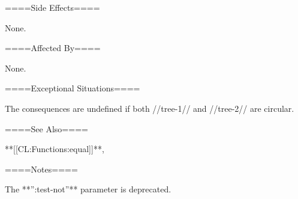 ====Side Effects====

None.

====Affected By====

None.

====Exceptional Situations====

The consequences are undefined if both //tree-1// and //tree-2// are circular.

====See Also====

**[[CL:Functions:equal]]**,

{\secref\TraversalRules}

====Notes====

The **'':test-not''** parameter is deprecated.

  
